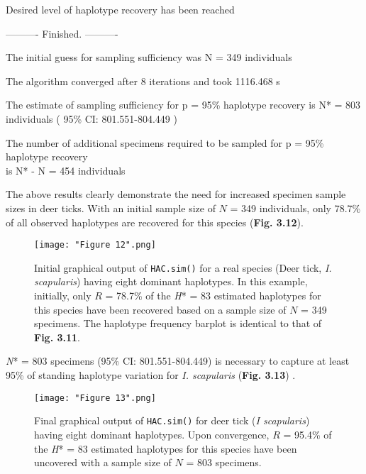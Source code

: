 {\vspace{3mm}
 
\noindent Desired level of haplotype recovery has been reached

\vspace{2mm}

\noindent ---------- Finished. ----------
        
\noindent The initial guess for sampling sufficiency was N = 349 individuals
 
\noindent The algorithm converged after 8 iterations and took 1116.468 s 
 
\noindent The estimate of sampling sufficiency for p = 95\% haplotype recovery is N* = 803 \\ individuals ( 95\% CI: 801.551-804.449 )

\noindent The number of additional specimens required to be sampled for p = 95\% haplotype recovery \\ is N* - N = 454 individuals}

\vspace{2mm}

The above results clearly demonstrate the need for increased specimen sample sizes in deer ticks. With an initial sample size of $N$ = 349 individuals, only 78.7\% of all observed haplotypes are recovered for this species (\textbf{Fig. 3.12}). 

\begin{figure}[H]

\centering

\texttt{[image: "Figure 12".png]}

\caption{Initial graphical output of {\tt HAC.sim()} for a real species (Deer tick, \textit{I. scapularis}) having eight dominant haplotypes. In this example, initially, only $R$ = 78.7\% of the \textit{H}* = 83 estimated haplotypes for this species have been recovered based on a sample size of $N$ = 349 specimens. The haplotype frequency barplot is identical to that of \textbf{Fig. 3.11}.}

\end{figure}


\noindent \textit{N}* = 803 specimens (95\% CI: 801.551-804.449) is necessary to capture at least 95\% of standing haplotype variation for \textit{I. scapularis} (\textbf{Fig. 3.13}) . 

\begin{figure}[H]

\centering

\texttt{[image: "Figure 13".png]}

\caption{Final graphical output of {\tt HAC.sim()} for deer tick (\textit{I scapularis}) having eight dominant haplotypes. Upon convergence, $R$ = 95.4\% of the \textit{H}* = 83 estimated haplotypes for this species have been uncovered with a sample size of $N$ = 803 specimens.
}

\end{figure}

